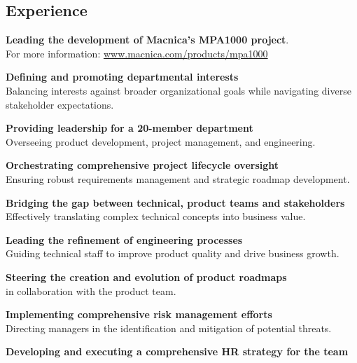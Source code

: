 \documentclass[]{private}
\begin{document}
\begin{paracol}{2}
    \section{Experience}
    \vspace{\topsep}
    \begin{tightemize}
        \item \textbf{Leading the development of Macnica's MPA1000 project}. \\
        For more information: \href{https://www.macnica.com/products/mpa1000}{www.macnica.com/products/mpa1000}
        \item \textbf{Defining and promoting departmental interests} \\
        Balancing interests against broader organizational goals while navigating diverse stakeholder expectations.
        \item \textbf{Providing leadership} \textbf{for a 20-member department}\\
        Overseeing product development, project management, and engineering.
        \item \textbf{Orchestrating comprehensive project lifecycle oversight} \\
        Ensuring robust requirements management and strategic roadmap development.
        \item \textbf{Bridging the gap between technical, product teams and stakeholders} \\ 
        Effectively translating complex technical concepts into business value.
        \item \textbf{Leading the refinement of engineering processes} \\
        Guiding technical staff to improve product quality and drive business growth.
        \item \textbf{Steering the creation and evolution of product roadmaps}  \\ in collaboration with the product team.
        \item \textbf{Implementing comprehensive risk management efforts} \\
        Directing managers in the identification and mitigation of potential threats.
        \item \textbf{Developing and executing a comprehensive HR strategy for the team} \\

\end{tightemize}
\end{paracol}
\end{document}
